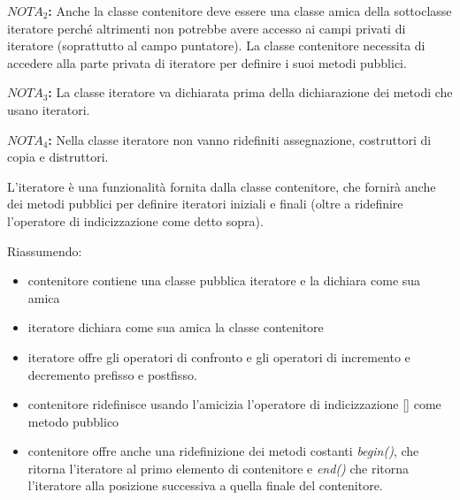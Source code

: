 \textbf{$NOTA_{2}$:} Anche la classe contenitore deve essere una classe amica della sottoclasse iteratore perché altrimenti non potrebbe avere accesso ai campi privati di iteratore (soprattutto al campo puntatore). La classe contenitore necessita di accedere alla parte privata di iteratore per definire i suoi metodi pubblici.

\textbf{$NOTA_{3}$:} La classe iteratore va dichiarata prima della dichiarazione dei metodi che usano iteratori.

\textbf{$NOTA_{4}$:} Nella classe iteratore non vanno ridefiniti assegnazione, costruttori di copia e distruttori. 

L'iteratore è una funzionalità fornita dalla classe contenitore, che fornirà anche dei metodi pubblici per definire iteratori iniziali e finali (oltre a ridefinire l'operatore di indicizzazione come detto sopra).

Riassumendo: 
\begin{itemize}
	\item contenitore contiene una classe pubblica iteratore e la dichiara come sua amica
	\item iteratore dichiara come sua amica la classe contenitore
	\item iteratore offre gli operatori di confronto e gli operatori di incremento e decremento prefisso e postfisso.
	\item contenitore ridefinisce usando l'amicizia l'operatore di indicizzazione [] come metodo pubblico
	\item contenitore offre anche una ridefinizione dei metodi costanti \textit{begin()}, che ritorna l'iteratore al primo elemento di contenitore e \textit{end()} che ritorna l'iteratore alla posizione successiva a quella finale del contenitore.
\end{itemize}

